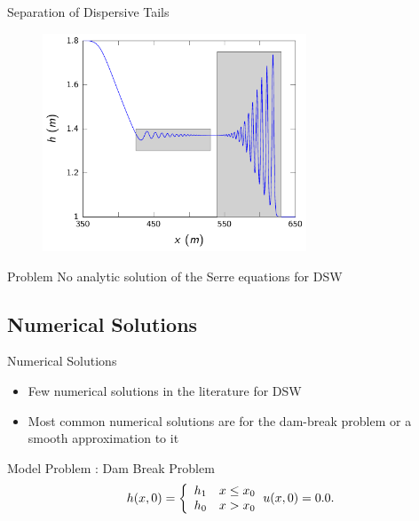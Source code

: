 \documentclass[pdf]{beamer}
\begin{document}

\begin{frame}{Separation of Dispersive Tails}
	\begin{figure}
		\includegraphics[width=0.7\textwidth]{./Pictures/DSW/DSWtails.pdf}
	\end{figure}
\end{frame}

\begin{frame}{Problem}
	No analytic solution of the Serre equations for DSW
\end{frame}

\subsection{Numerical Solutions}
\begin{frame}{Numerical Solutions}
	\begin{itemize}
		\item Few numerical solutions in the literature for DSW
		\item Most common numerical solutions are for the dam-break problem or a smooth approximation to it
	\end{itemize}
\end{frame}

\begin{frame}{Model Problem : Dam Break Problem}
	\begin{subequations}
		\begin{gather*}
		h(x,0) = \left\lbrace \begin{array}{c c}
		h_1  & x \le x_0\\ h_0  & x > x_0 
		\end{array} \right. 
		\end{gather*}
		\begin{gather*}
		u(x,0) = 0.0 .
		\end{gather*}
	\end{subequations} 

\end{frame}
\end{document}
